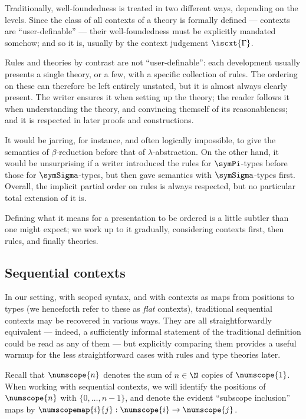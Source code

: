 Traditionally, well-foundedness is treated in two different ways, depending on the levels.
%
Since the class of all contexts of a theory is formally defined --- contexts are ``user-definable'' --- their well-foundedness must be explicitly mandated somehow; and so it is, usually by the context judgement $\iscxt{ \Gamma }$.

Rules and theories by contrast are not “user-definable”: each development usually presents a single theory, or a few, with a specific collection of rules.
%
The ordering on these can therefore be left entirely unstated,
%
but it is almost always clearly present.
%
The writer ensures it when setting up the theory; the reader follows it when understanding the theory, and convincing themself of its reasonableness; and it is respected in later proofs and constructions.

It would be jarring, for instance, and often logically impossible, to give the semantics of $\beta$-reduction before that of $\lambda$-abstraction.
%
On the other hand, it would be unsurprising if a writer introduced the rules for $\symPi$-types before those for $\symSigma$-types, but then gave semantics with $\symSigma$-types first.
%
Overall, the implicit partial order on rules is always respected, but no particular total extension of it is.

Defining what it means for a presentation to be ordered is a little subtler than one might expect;
%
we work up to it gradually, considering contexts first, then rules, and finally theories.

\subsection{Sequential contexts}
\label{sec:sequential-contexts}

In our setting, with scoped syntax, and with contexts as maps from positions to types (we henceforth refer to these as \emph{flat} contexts), traditional sequential contexts may be recovered in various ways.
%
They are all straightforwardly equivalent --- indeed, a sufficiently informal statement of the traditional definition could be read as any of them --- but explicitly comparing them provides a useful warmup for the less straightforward cases with rules and type theories later.

Recall that $\numscope{n}$ denotes the sum of $n \in \N$ copies of $\numscope{1}$.
%
When working with sequential contexts, we will identify the positions of $\numscope{n}$ with $\{0, \ldots, n-1\}$, and denote the evident “subscope inclusion” maps by $\numscopemap{i}{j} : \numscope{i} \to \numscope{j}$.

